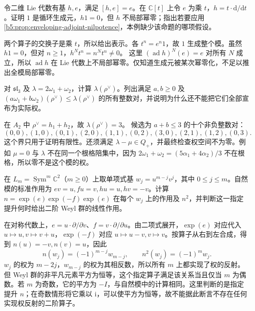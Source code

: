 \begin{exercise}\label{b5:ex:18-local-nilpotence-condition}
	令二维 Lie 代数有基 \(h,e\)，满足 \([h,e]=e\)。在 \(\mathbb C[t]\) 上令 \(e\) 为乘 \(t\)，\(h=t\cdot\mathrm{d}/\mathrm{d}t\)。证明 \(1\) 是循环生成元，\(h1=0\)，但 \(h\) 不局部幂零；指出若要应用\cref{b5:prop:enveloping-adjoint-nilpotence}，本例缺少该命题的哪项假设。
\end{exercise}
\begin{solution}
	两个算子的交换子是乘 \(t\)，所以给出表示。各 \(t^n=e^n1\)，故 \(1\) 生成整个模。虽然 \(h1=0\)，但对 \(n\ge1\)，\(h^Nt^n=n^Nt^n\ne0\)。 这里 \((\operatorname{ad}h)^N(e)=e\) 对所有 \(N\) 成立，所以 \(\operatorname{ad}h\) 在 Lie 代数上不局部幂零。仅知道生成元被某次幂零化，不足以推出全模局部幂零。
\end{solution}

\begin{exercise}\label{b5:ex:18-dominant-bound-sl3}
	对 \(\mathfrak{sl}_3\) 及 \(\lambda=2\omega_1+\omega_2\)，计算 \(\lambda(\rho^\vee)\)。列出满足 \(a,b\ge0\) 及 \((a\omega_1+b\omega_2)(\rho^\vee)\le\lambda(\rho^\vee)\) 的所有整数对，并说明为什么还不能把它们全部宣布为实际权。
\end{exercise}
\begin{solution}
	在 \(A_2\) 中 \(\rho^\vee=h_1+h_2\)，故 \(\lambda(\rho^\vee)=3\)。 候选为 \(a+b\le3\) 的十个非负整数对：
	\[
		(0,0),(1,0),(0,1),(2,0),(1,1),(0,2),(3,0),(2,1),(1,2),(0,3).
	\]
	这个界只用于证明有限性。还须满足 \(\lambda-\mu\in Q_+\)，并最终检查权空间不为零。例如 \(\mu=0\) 与 \(\lambda\) 不在同一个根格陪集中，因为 \(2\omega_1+\omega_2=(5\alpha_1+4\alpha_2)/3\) 不在根格，所以零不是这个模的权。
\end{solution}

\begin{exercise}\label{b5:ex:18-reflection-lift-square}
	在 \(L_m=\operatorname{Sym}^m\mathbb C^2\)（\(m\ge0\)）上取单项式基 \(w_j=u^{m-j}v^j\)，其中 \(0\le j\le m\)。自然模的标准作用为 \(ev=u,fu=v,hu=u,hv=-v\)。计算 \(n=\exp(e)\exp(-f)\exp(e)\) 在每个 \(w_j\) 上的作用及 \(n^2\)，并判断这一指定提升何时给出二阶 Weyl 群的线性作用。
\end{exercise}
\begin{solution}
	在对称代数上，\(e=u\cdot\partial/\partial v\)、\(f=v\cdot\partial/\partial u\)。由二项式展开，\(\exp(e)\) 对应代入 \(u\mapsto u,v\mapsto v+u\)，\(\exp(-f)\) 对应 \(u\mapsto u-v,v\mapsto v\)。按算子从右到左合成，得到 \(n(u)=-v,n(v)=u\)，因此
	\[
		n(w_j)=(-1)^{m-j}w_{m-j},\qquad n^2(w_j)=(-1)^m w_j.
	\]
	\(w_j\) 的权为 \(m-2j\)，\(w_{m-j}\) 的权为其相反数，所以所有 \(m\) 上都实现了权的反射。但 Weyl 群的非平凡元素平方为恒等，这个指定算子满足该关系当且仅当 \(m\) 为偶数。若 \(m\) 为奇数，它的平方为 \(-I\)，与自然模中的计算相同。这里判断的是指定提升 \(n\)；在奇数情形将它乘以 \(\mathrm i\)，可以使平方为恒等，故不能据此断言不存在任何实现权反射的二阶算子。
\end{solution}

